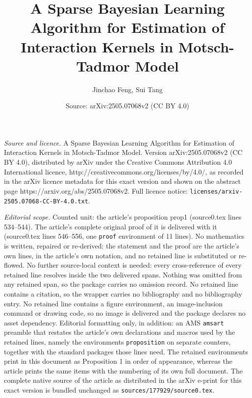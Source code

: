 \documentclass[10pt,a4paper]{amsart}
\title{A Sparse Bayesian Learning Algorithm for Estimation of Interaction Kernels in Motsch-Tadmor Model}
\author{Jinchao Feng, Sui Tang}
\date{Source: arXiv:2505.07068v2 (CC BY 4.0)}
\begin{document}
\maketitle

\noindent\emph{Source and licence.} A Sparse Bayesian Learning Algorithm for Estimation of Interaction Kernels in Motsch-Tadmor Model. Version arXiv:2505.07068v2 (CC BY 4.0), distributed by arXiv under the Creative Commons Attribution 4.0 International licence, http://creativecommons.org/licenses/by/4.0/, as recorded in the arXiv licence metadata for this exact version and shown on the abstract page https://arxiv.org/abs/2505.07068v2. Full licence notice: \texttt{licenses/arxiv-2505.07068-CC-BY-4.0.txt}.\par\smallskip

\noindent\textit{Editorial scope.} Counted unit: the article's proposition prop1 (source0.tex lines 534--544). The article's complete original proof of it is delivered with it (source0.tex lines 546--556, one \texttt{proof} environment of 11 lines). No mathematics is written, repaired or re-derived: the statement and the proof are the article's own lines, in the article's own notation, and no retained line is substituted or re-flowed.  No further source-local context is needed: every cross-reference of every retained line resolves inside the two delivered spans.  Nothing was omitted from any retained span, so the package carries no omission record.  No retained line contains a citation, so the wrapper carries no bibliography and no bibliography entry.  No retained line contains a figure environment, an image-inclusion command or drawing code, so no image is delivered and the package declares no asset dependency.  Editorial formatting only, in addition: an AMS \texttt{amsart} preamble that restates the article's own declarations and macros used by the retained lines, namely the environments \texttt{proposition} on separate counters, together with the standard packages those lines need.  The retained environments print in this document as Proposition 1 in order of appearance, whereas the article prints the same items with the numbering of its own full document.  The complete native source of the article as distributed in the arXiv e-print for this exact version is bundled unchanged as \texttt{sources/177929/source0.tex}.
\end{document}
